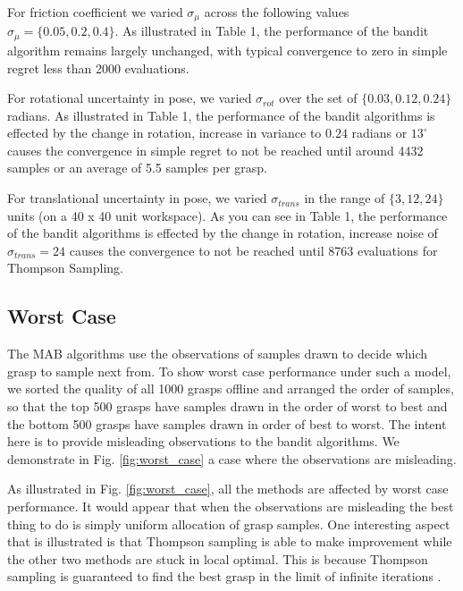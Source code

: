 \documentclass[10pt, conference]{ieeeconf}      %
\begin{document}
For friction coefficient we varied $\sigma_{\mu}$ across the following values $\sigma_{\mu} = \lbrace 0.05, 0.2, 0.4 \rbrace$. As illustrated in Table 1, the performance of the bandit algorithm remains largely unchanged, with typical convergence to zero in simple regret less than 2000 evaluations.

For rotational uncertainty in pose, we varied $\sigma_{rot}$ over the set of $\lbrace 0.03, 0.12,0.24\rbrace$ radians. As illustrated in Table 1, the performance of the bandit algorithms is effected by the change in rotation, increase in variance to $0.24$ radians or $13^{\circ}$  causes the convergence in simple regret to not be reached until around 4432 samples or an average of 5.5 samples per grasp. 

For translational uncertainty in pose, we varied $\sigma_{trans}$ in the range of $\lbrace 3,12, 24 \rbrace$ units (on a 40 x 40 unit workspace). As you can see in Table 1, the performance of the bandit algorithms is effected by the change in rotation, increase noise of $\sigma_{trans} = 24$ causes the convergence to not be reached until 8763 evaluations for Thompson Sampling. 



\subsection{Worst Case}
The MAB algorithms use the observations of samples drawn to decide which grasp to sample next from. To show worst case performance under such a model, we sorted the quality of all 1000 grasps offline and arranged the order of samples, so that the top 500 grasps have samples drawn in the order of worst to best and the bottom 500 grasps have samples drawn in order of best to worst. The intent here is to provide misleading observations to the bandit algorithms. We demonstrate in Fig. \ref{fig:worst_case} a case where the observations are misleading. 

As illustrated in Fig. \ref{fig:worst_case}, all the methods are affected by worst case performance. It would appear that when the observations are misleading the best thing to do is simply uniform allocation of grasp samples. One interesting aspect that is illustrated is that Thompson sampling is able to make improvement while the other two methods are stuck in local optimal. This is because Thompson sampling is guaranteed to find the best grasp in the limit of infinite iterations \cite{agrawal2011analysis}.
\end{document}
